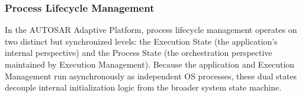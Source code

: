 

\subsubsection{Process Lifecycle Management}

In the AUTOSAR Adaptive Platform, process lifecycle management operates on two distinct but synchronized levels: the {Execution State} (the application's internal perspective) and the {Process State} (the orchestration perspective maintained by Execution Management). Because the application and Execution Management run asynchronously as independent OS processes, these dual states decouple internal initialization logic from the broader system state machine.

